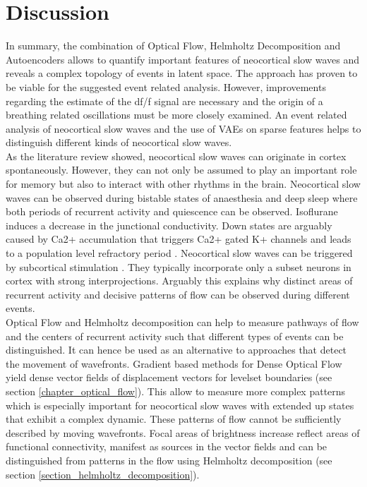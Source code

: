
\chapter{Discussion} %
In summary, the combination of Optical Flow, Helmholtz Decomposition and Autoencoders allows to quantify important features of neocortical slow waves and reveals a complex topology of events in latent space. The approach has proven to be viable for the suggested event related analysis. However, improvements regarding the estimate of the df/f signal are necessary and the origin of a breathing related oscillations must be more closely examined. An event related analysis of neocortical slow waves and the use of VAEs on sparse features helps to distinguish different kinds of neocortical slow waves.\\
As the literature review showed, neocortical slow waves can originate in cortex spontaneously. However, they can not only be assumed to play an important role for memory but also to interact with other rhythms in the brain. Neocortical slow waves can be observed during bistable states of anaesthesia and deep sleep where both periods of recurrent activity and quiescence can be observed. Isoflurane induces a decrease in the junctional conductivity. Down states are arguably caused by Ca2+ accumulation that triggers Ca2+ gated K+ channels and leads to a population level refractory period \parencite{neske2016slow}. Neocortical slow waves can be triggered by subcortical stimulation \parencite{stroh2013making}. They typically incorporate only a subset neurons in cortex with strong interprojections. Arguably this explains why distinct areas of recurrent activity and decisive patterns of flow can be observed during different events.\\
Optical Flow and Helmholtz decomposition can help to measure pathways of flow and the centers of recurrent activity such that different types of events can be distinguished. It can hence be used as an alternative to approaches that detect the movement of wavefronts. Gradient based methods for Dense Optical Flow yield dense vector fields of displacement vectors for levelset boundaries (see section \ref{chapter_optical_flow}). This allow to measure more complex patterns which is especially important for neocortical slow waves with extended up states that exhibit a complex dynamic. These patterns of flow cannot be sufficiently described by moving wavefronts. Focal areas of brightness increase reflect areas of functional connectivity, manifest as sources in the vector fields and can be distinguished from patterns in the flow using Helmholtz decomposition (see section \ref{section_helmholtz_decomposition}). \\
